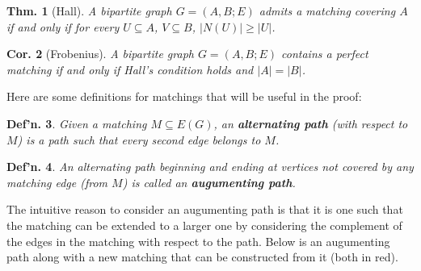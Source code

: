 \documentclass[12pt, a4paper]{book}
\newtheorem{theorem}{Thm.}[section]
\newtheorem{definition}[theorem]{Def'n.}
\newtheorem{corollary}[theorem]{Cor.}
\theoremstyle{nonumberplain}
\begin{document}
\begin{theorem}[Hall]
    A bipartite graph $G=(A,B;E)$ admits a matching covering $A$ if and only if for every $U\subseteq A$, $V\subseteq B$, $|N(U)|\geq |U|$.
\end{theorem}
\begin{corollary}[Frobenius]
    A bipartite graph $G=(A,B;E)$ contains a perfect matching if and only if Hall's condition holds and $|A|=|B|$.
\end{corollary}
Here are some definitions for matchings that will be useful in the proof:
\begin{definition}
    Given a matching $M\subseteq E(G)$, an \textbf{alternating path} (with respect to $M$) is a path such that every second edge belongs to $M$.
\end{definition}
\begin{definition}
    An alternating path beginning and ending at vertices not covered by any matching edge (from $M$) is called an \textbf{augumenting path}.
\end{definition}
The intuitive reason to consider an augumenting path is that it is one such that the matching can be extended to a larger one by considering the complement of the edges in the matching with respect to the path.
Below is an augumenting path along with a new matching that can be constructed from it (both in red).
\begin{center}
\end{center}
\end{document}
